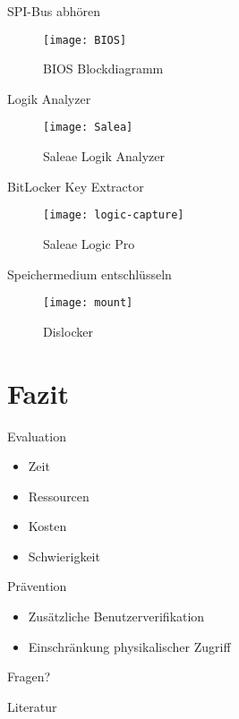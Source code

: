 \documentclass[10pt]{beamer}
\begin{document}
	\begin{frame}{SPI-Bus abhören}
\begin{figure}[h!]
	\centering
	\texttt{[image: BIOS]}
	\caption{BIOS Blockdiagramm \cite{MacronixInternationalCo.LTD..2010}}
\end{figure}
	\end{frame}
	
	\begin{frame}{Logik Analyzer}
			\begin{figure}[h!]
			\centering
			\texttt{[image: Salea]}
			\caption{Saleae Logik Analyzer}
		\end{figure}
	\end{frame}
	
	\begin{frame}{BitLocker Key Extractor}
		\begin{figure}[h!]
			\centering
			\texttt{[image: logic-capture]}
			\caption{Saleae Logic Pro \cite{.15122021}}
		\end{figure}
	\end{frame}
	
	\begin{frame}{Speichermedium entschlüsseln}
				\begin{figure}[h!]
			\centering
			\texttt{[image: mount]}
			\caption{Dislocker \cite{.16122020b}}
		\end{figure}
		
	\end{frame}

	
	\section{Fazit}
	
	\begin{frame}{Evaluation}
		\begin{itemize}[<+- | alert@+>]
			\item Zeit
			\item Ressourcen
			\item Kosten
			\item Schwierigkeit
		\end{itemize}		
	\end{frame}
	
	\begin{frame}{Prävention}
		\begin{itemize}[<+- | alert@+>]
			\item Zusätzliche Benutzerverifikation
			\item Einschränkung physikalischer Zugriff
		\end{itemize}		
	\end{frame}
	
	\begin{frame}[standout]
		Fragen?
	\end{frame}

	\begin{frame}[allowframebreaks]{Literatur}
		  
  			
	\end{frame}
\end{document}
